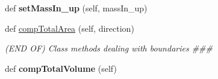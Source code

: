 \begin{DoxyCompactItemize}
\item 
def {\bfseries set\+Mass\+In\+\_\+up} (self, mass\+In\+\_\+up)\hypertarget{classcomp_1_1Comp_a704cddd08bfe38a86e5658744f33a4de}{}\label{classcomp_1_1Comp_a704cddd08bfe38a86e5658744f33a4de}

\item 
def \hyperlink{classcomp_1_1Comp_af6d700899b8a97e67233d25626554263}{comp\+Total\+Area} (self, direction)
\begin{DoxyCompactList}\small\item\em (E\+ND OF) Class methods dealing with boundaries \#\#\# \end{DoxyCompactList}\item 
def {\bfseries comp\+Total\+Volume} (self)\hypertarget{classcomp_1_1Comp_ac8ec3d15a67a816e5a42ff5facf6753b}{}\label{classcomp_1_1Comp_ac8ec3d15a67a816e5a42ff5facf6753b}


\end{DoxyCompactItemize}
